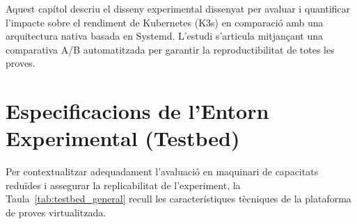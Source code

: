 %

%

Aquest capítol descriu el disseny experimental dissenyat per avaluar i quantificar l'impacte sobre el rendiment de Kubernetes (K3s) en comparació amb una arquitectura nativa basada en Systemd. L'estudi s'articula mitjançant una comparativa A/B automatitzada per garantir la reproductibilitat de totes les proves.

\section{Especificacions de l'Entorn Experimental (Testbed)}
Per contextualitzar adequadament l'avaluació en maquinari de capacitats reduïdes i assegurar la replicabilitat de l'experiment, la Taula~\ref{tab:testbed_general} recull les característiques tècniques de la plataforma de proves virtualitzada.

